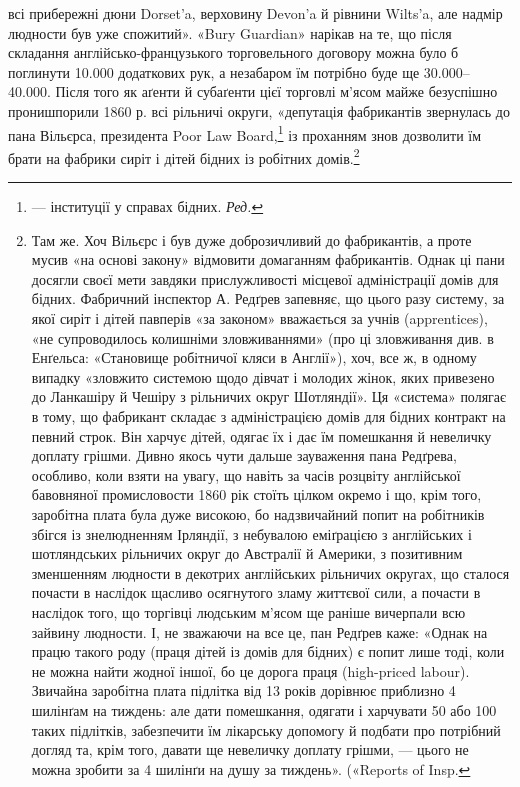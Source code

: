 всі прибережні дюни Dorset’a, верховину Devon’a
й рівнини Wilts’a, але надмір людности був уже спожитий».
«Bury Guardian» нарікав на те, що після складання англійсько-французького
торговельного договору можна було б поглинути
10.000 додаткових рук, а незабаром їм потрібно буде ще 30.000--40.000.
Після того як аґенти й субаґенти цієї торговлі м’ясом
майже безуспішно пронишпорили 1860 р. всі рільничі округи,
«депутація фабрикантів звернулась до пана Вільєрса, президента
Poor Law Board,\footnote*{
— інституції у справах бідних. \emph{Ред.}
} із проханням знов дозволити їм брати на
фабрики сиріт і дітей бідних із робітних домів.\footnote{
Там же. Хоч Вільєрс і був дуже доброзичливий до фабрикантів,
а проте мусив «на основі закону» відмовити домаганням фабрикантів.
Однак ці пани досягли своєї мети завдяки прислужливості місцевої
адміністрації домів для бідних. Фабричний інспектор А. Редґрев запевняє,
що цього разу систему, за якої сиріт і дітей павперів «за законом» вважається
за учнів (apprentices), «не супроводилось колишніми зловживаннями»
(про ці зловживання див. в Енґельса: «Становище робітничої
кляси в Англії»), хоч, все ж, в одному випадку «зловжито системою щодо
дівчат і молодих жінок, яких привезено до Ланкашіру й Чешіру з рільничих
округ Шотляндії». Ця «система» полягає в тому, що фабрикант складає
з адміністрацією домів для бідних контракт на певний строк. Він харчує
дітей, одягає їх і дає їм помешкання й невеличку доплату грішми.
Дивно якось чути дальше зауваження пана Редґрева, особливо, коли взяти
на увагу, що навіть за часів розцвіту англійської бавовняної промисловости
1860 рік стоїть цілком окремо і що, крім того, заробітна плата була
дуже високою, бо надзвичайний попит на робітників збігся із знелюдненням
Ірляндії, з небувалою еміґрацією з англійських і шотляндських
рільничих округ до Австралії й Америки, з позитивним зменшенням людности
в декотрих англійських рільничих округах, що сталося почасти в
наслідок щасливо осягнутого зламу життєвої сили, а почасти в наслідок
того, що торгівці людським м’ясом ще раніше вичерпали всю зайвину
людности. І, не зважаючи на все це, пан Редґрев каже: «Однак на працю
такого роду (праця дітей із домів для бідних) є попит лише тоді, коли не
можна найти жодної іншої, бо це дорога праця (high-priced labour).
Звичайна заробітна плата підлітка від 13 років дорівнює приблизно 4 шилінґам
на тиждень: але дати помешкання, одягати і харчувати 50 або 100
таких підлітків, забезпечити їм лікарську допомогу й подбати про потрібний
догляд та, крім того, давати ще невеличку доплату грішми, — цього
не можна зробити за 4 шилінґи на душу за тиждень». («Reports of Insp.
}
